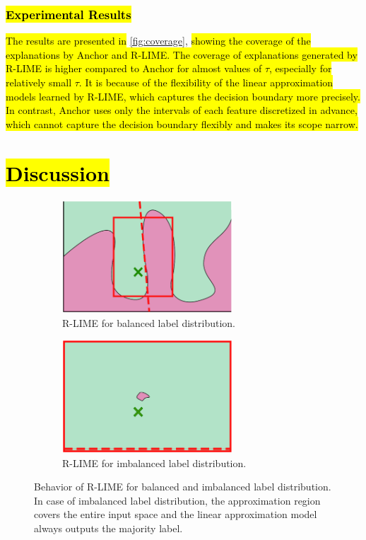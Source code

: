 \documentclass[runningheads]{llncs}
\begin{document}
{\subsubsection{\hl{Experimental Results}}
\hl{The results are presented in} \cref{fig:coverage},
\hl{%
  showing the coverage of the explanations by Anchor and R-LIME\@.
  The coverage of explanations generated by R-LIME is higher compared to Anchor
  for almost values of $\tau$, especially for relatively small $\tau$.
  It is because of the flexibility of the linear approximation models learned by
  R-LIME, which captures the decision boundary more precisely.
  In contrast,
  Anchor uses only the intervals of each feature discretized in advance,
  which cannot capture the decision boundary flexibly and makes its scope narrow.
}


\section{\hl{Discussion}}
 {%
  \def\imgwidth{0.47\textwidth}
  \begin{figure}[t]
    \centering
    \begin{subfigure}[t]{\imgwidth}
      \centering
      \includegraphics[width=0.7\textwidth]{visual-rlime3}
      \caption{R-LIME for balanced label distribution.}
    \end{subfigure}
    \begin{subfigure}[t]{\imgwidth}
      \centering
      \includegraphics[width=0.7\textwidth]{visual-rlime-imbalanced}
      \caption{R-LIME for imbalanced label distribution.
      }
    \end{subfigure}
    \caption[Behavior of R-LIME for balanced and imbalanced label distribution]{%
      Behavior of R-LIME for balanced and imbalanced label distribution.
      In case of imbalanced label distribution,
      the approximation region covers the entire input space and the
      linear approximation model always outputs the majority label.
    }\label{fig:imbalanced}
  \end{figure}
 }

}
\end{document}
